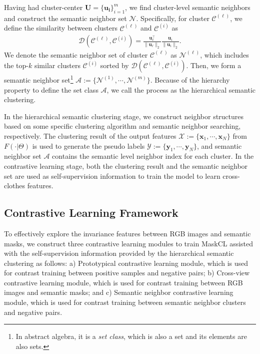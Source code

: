 \documentclass[10pt,twocolumn,letterpaper]{article}
\def\x{\boldsymbol{x}}
\def\y{\boldsymbol{y}}
\def\A{\mathcal{A}}
\def\C{\mathcal{C}}
\def\D{\mathcal{D}}
\def\N{\mathcal{N}}
\def\X{\mathcal{X}}
\def\Y{\mathcal{Y}}
\begin{document}
Having had cluster-center $\boldsymbol{U}= {\{\boldsymbol{u_i}}\}_{i=1}^m$, we find cluster-level semantic neighbors and construct the semantic neighbor set $\N$. 
Specifically, for cluster $\C^{(\ell)}$, we define the similarity between clusters $\C^{(\ell)}$ and $\C^{(i)}$ as 
\begin{equation}
\begin{aligned}
\D(\C^{(\ell)}, \C^{(i)}) = \frac{\boldsymbol{u}_\ell^{\top}}{\|\boldsymbol{u}_{\ell}\|_2} \frac{ \boldsymbol{u}_i}{\| \boldsymbol{u}_i \|_2}.
\end{aligned}
\label{eq:cluster_sim}
\end{equation}
We denote the semantic neighbor set of cluster $\C^{(\ell)}$ as $\N^{(\ell)}$, 
which includes the top-$k$ similar clusters $\C^{(i)}$ sorted by $\D(\C^{(\ell)}, \C^{(i)})$. 
Then, we form a semantic neighbor set\footnote{In abstract algebra, it is a {\it set class}, which is also a set and its elements are also sets.} $\A:= \{ \N^{(1)},\cdots, \N^{(m)} \}$. Because of the hierarchy property to define the set class $\A$, we call the process as the hierarchical semantic clustering. 


In the hierarchical semantic clustering stage, we construct neighbor structures based on some specific clustering algorithm and semantic neighbor searching, respectively. The clustering result of the output features $\X:=\{\x_1,\cdots,\x_N\}$ from $F(\cdot|\Theta)$ is used to generate the pseudo labels $\Y :=\{\y_1,\cdots,\y_N\}$, and semantic neighbor set $\A$ contains the semantic level neighbor index for each cluster. 
In the contrastive learning stage, both the clustering result and the semantic neighbor set are used as self-supervision information to train the model to learn cross-clothes features.


\subsection{Contrastive Learning Framework }
\label{sec:Contrastive-Learning-Framework}

To effectively explore the invariance features between RGB images and semantic masks, we construct three contrastive learning modules to train MaskCL assisted with the self-supervision information provided by the hierarchical semantic clustering as follows:
a) Prototypical contrastive learning module, which is used for contrast training between positive samples and negative pairs;
b) Cross-view contrastive learning module, which is used for contrast training between RGB images and semantic masks; and
c) Semantic neighbor contrastive learning module, which is used for contrast training between semantic neighbor clusters and negative pairs.
\end{document}
